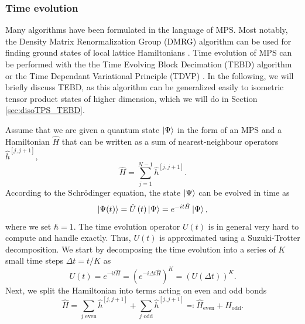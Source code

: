 \subsubsection*{\hspace{162pt}Time evolution}
Many algorithms have been formulated in the language of MPS. Most notably, the Density Matrix Renormalization Group (DMRG) algorithm can be used for finding ground states of local lattice Hamiltonians \cite{cite:DMRG_in_the_age_of_MPS}. Time evolution of MPS can be performed with the the Time Evolving Block Decimation (TEBD) algorithm \cite{cite:efficient_simulation_of_1D_quantum_many_body_systems, cite:matrix_product_density_operators_simulation_of_finite_temperature_and_dissipative_systems} or the Time Dependant Variational Principle (TDVP) \cite{cite:time_dependent_variational_principle_for_quantum_lattices, cite:unifying_time_evolution_and_optimization_with_MPS}. In the following, we will briefly discuss TEBD, as this algorithm can be generalized easily to isometric tensor product states of higher dimension, which we will do in Section \ref{sec:disoTPS_TEBD}. \par
Assume that we are given a quantum state $\ket{\Psi}$ in the form of an MPS and a Hamiltonian $\hat{H}$ that can be written as a sum of nearest-neighbour operators $\hat{h}^{[j,j+1]}$,
\begin{equation}
	\hat{H} = \sum_{j = 1}^{N-1} \hat{h}^{[j,j+1]}.
\end{equation}
According to the Schrödinger equation, the state $\ket{\Psi}$ can be evolved in time as
\begin{equation}
	\ket{\Psi(t)} = \hat{U}\left(t\right) \ket{\Psi} = e^{-it\hat{H}} \ket{\Psi},
\end{equation}
where we set $\hbar = 1$. The time evolution operator $U(t)$ is in general very hard to compute and handle exactly. Thus, $U(t)$ is approximated using a Suzuki-Trotter decomposition. We start by decomposing the time evolution into a series of $K$ small time steps $\Delta t = t/K$ as
\begin{equation}
	U(t) = e^{-it\hat{H}} = \left(e^{-i\Delta t\hat{H}}\right)^K = \left(U(\Delta t)\right)^K.
\end{equation}
Next, we split the Hamiltonian into terms acting on even and odd bonds
\begin{equation}
	\hat{H} = \sum_{j \text{ even}}\hat{h}^{[j, j+1]} + \sum_{j \text{ odd}}\hat{h}^{[j, j+1]} \eqqcolon \hat{H}_\text{even} + \hat{H}_\text{odd}.
\end{equation}
